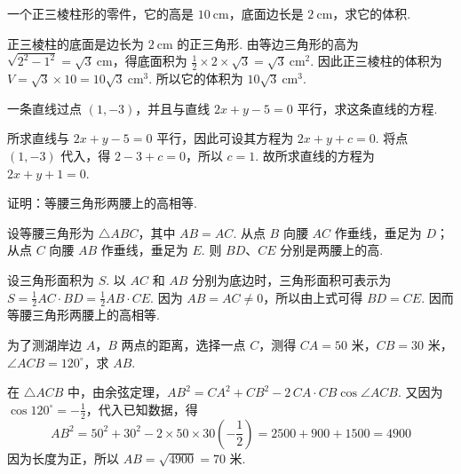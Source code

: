 \begin{problem}
一个正三棱柱形的零件，它的高是 \(10\mathrm{~cm}\)，底面边长是 \(2\mathrm{~cm}\)，求它的体积.
\end{problem}

\begin{solution}
正三棱柱的底面是边长为 \(2\mathrm{~cm}\) 的正三角形. 由等边三角形的高为 \(\sqrt{2^{2}-1^{2}}=\sqrt{3}\mathrm{~cm}\)，得底面积为 \(\frac{1}{2}\times2\times\sqrt{3}=\sqrt{3}\mathrm{~cm}^{2}\). 因此正三棱柱的体积为 \(V=\sqrt{3}\times10=10\sqrt{3}\mathrm{~cm}^{3}\).
所以它的体积为 \(10\sqrt{3}\mathrm{~cm}^{3}\).
\end{solution}

\begin{problem}
一条直线过点 \(\left(1,-3\right)\)，并且与直线 \(2x+y-5=0\) 平行，求这条直线的方程.
\end{problem}

\begin{solution}
所求直线与 \(2x+y-5=0\) 平行，因此可设其方程为 \(2x+y+c=0\). 将点 \(\left(1,-3\right)\) 代入，得 \(2-3+c=0\)，所以 \(c=1\). 故所求直线的方程为 \(2x+y+1=0\).
\end{solution}

\begin{problem}
证明：等腰三角形两腰上的高相等.
\end{problem}

\begin{solution}
设等腰三角形为 \(\triangle ABC\)，其中 \(AB=AC\). 从点 \(B\) 向腰 \(AC\) 作垂线，垂足为 \(D\)；从点 \(C\) 向腰 \(AB\) 作垂线，垂足为 \(E\). 则 \(BD\)、\(CE\) 分别是两腰上的高.

设三角形面积为 \(S\). 以 \(AC\) 和 \(AB\) 分别为底边时，三角形面积可表示为 \(S=\frac{1}{2}AC\cdot BD=\frac{1}{2}AB\cdot CE\).
因为 \(AB=AC\neq0\)，所以由上式可得 \(BD=CE\). 因而等腰三角形两腰上的高相等.
\end{solution}

\begin{problem}
为了测湖岸边 \(A\)，\(B\) 两点的距离，选择一点 \(C\)，测得 \(CA=50\text{ 米}\)，\(CB=30\text{ 米}\)，\(\angle ACB=120^\circ\)，求 \(AB\).
\end{problem}

\begin{solution}
在 \(\triangle ACB\) 中，由余弦定理，\(AB^{2}=CA^{2}+CB^{2}-2\,CA\cdot CB\cos\angle ACB\). 又因为 \(\cos120^\circ=-\frac{1}{2}\)，代入已知数据，得
\[
AB^{2}=50^{2}+30^{2}-2\times50\times30\left(-\frac{1}{2}\right)=2500+900+1500=4900
\]
因为长度为正，所以 \(AB=\sqrt{4900}=70\text{ 米}\).
\end{solution}

